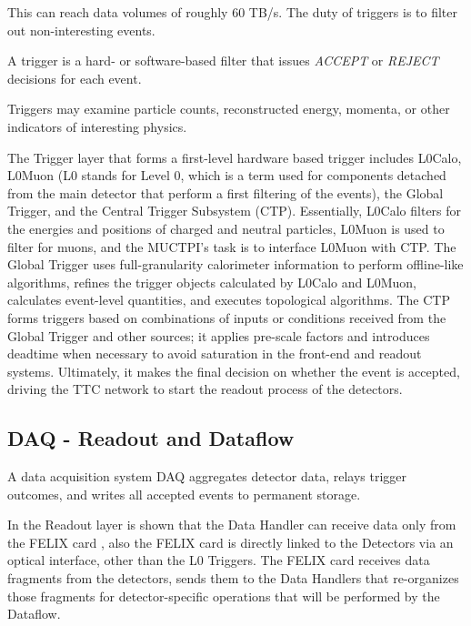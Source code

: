 This can reach data volumes of roughly 60 TB/s. The duty of triggers is to filter out non-interesting events.

\begin{definition}
\label{def:trigger}
A trigger is a hard- or software-based filter that issues \emph{ACCEPT} or \emph{REJECT} decisions for each event.
\end{definition}

Triggers may examine particle counts, reconstructed energy, momenta, or other indicators of interesting physics.

The Trigger layer that forms a first-level hardware based trigger includes \cite{tdaq} \acs{L0Calo}, \acs{L0Muon} (\acs{L0} stands for Level 0, which is a term used for components detached from the main detector that perform a first filtering of the events), the Global Trigger, and the Central Trigger Subsystem (\acs{CTP}). Essentially, \acs{L0Calo} filters for the energies and positions of charged and neutral particles, \acs{L0Muon} is used to filter for muons, and the \acs{MUCTPI}'s task is to interface \acs{L0Muon} with \acs{CTP}. The Global Trigger \cite{tdaq} uses full-granularity calorimeter information to perform offline-like algorithms, refines the trigger objects calculated by \acs{L0Calo} and \acs{L0Muon}, calculates event-level quantities, and executes topological algorithms. The \acs{CTP} \cite{tdaq} forms triggers based on combinations of inputs or conditions received from the Global Trigger and other sources; it applies pre-scale factors and introduces deadtime when necessary to avoid saturation in the front-end and readout systems. Ultimately, it makes the final decision on whether the event is accepted, driving the \acs{TTC} network to start the readout process of the detectors.

\subsection{\acs{DAQ} - Readout and Dataflow}
\label{subsec:daq}

\begin{definition}
\label{def:daq}
A data acquisition system \acs{DAQ} aggregates detector data, relays trigger outcomes, and writes all accepted events to permanent storage.
\end{definition}

In the Readout layer is shown that the Data Handler can receive data only from the \acs{FELIX} card \cite{tdaq}, also the \acs{FELIX} card is directly linked to the Detectors via an optical interface, other than the \acs{L0} Triggers. The \acs{FELIX} card receives data fragments from the detectors, sends them to the Data Handlers that re-organizes those fragments for detector-specific operations that will be performed by the Dataflow.

